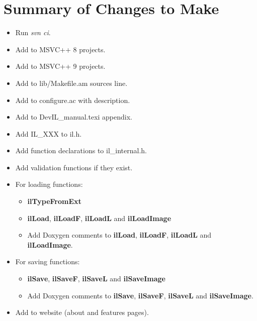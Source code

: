 \documentclass[letterpaper,10pt]{article}
\begin{document}
\section*{Summary of Changes to Make}
\begin{itemize}
\item Run \emph{svn ci}.
\item Add to MSVC++ 8 projects.
\item Add to MSVC++ 9 projects.
\item Add to lib/Makefile.am sources line.
\item Add to configure.ac with description.
\item Add to DevIL_manual.texi appendix.
\item Add IL\_XXX to il.h.
\item Add function declarations to il\_internal.h.
\item Add validation functions if they exist.
\item For loading functions:
	\begin {itemize}
		\item \textbf{ilTypeFromExt}
		\item \textbf{ilLoad}, \textbf{ilLoadF}, \textbf{ilLoadL} and \textbf{ilLoadImage}
		\item Add Doxygen comments to \textbf{ilLoad}, \textbf{ilLoadF}, \textbf{ilLoadL} and \textbf{ilLoadImage}.
	\end {itemize}
\item For saving functions:
	\begin {itemize}
		\item \textbf{ilSave}, \textbf{ilSaveF}, \textbf{ilSaveL} and \textbf{ilSaveImage}
		\item Add Doxygen comments to \textbf{ilSave}, \textbf{ilSaveF}, \textbf{ilSaveL} and \textbf{ilSaveImage}.
	\end {itemize}
\item Add to website (about and features pages).
\end{itemize}
\end{document}
